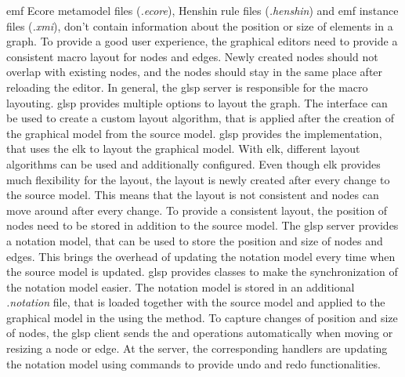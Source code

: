   \ac{emf} Ecore metamodel files (\textit{.ecore}), Henshin rule files (\textit{.henshin}) and \ac{emf} instance files (\textit{.xmi}), don't contain information about the position or size of elements in a graph. \cite{emf,henshin-repo} To provide a good user experience, the graphical editors need to provide a consistent macro layout for nodes and edges. Newly created nodes should not overlap with existing nodes, and the nodes should stay in the same place after reloading the editor. In general, the \ac{glsp} server is responsible for the macro layouting. \cite{glsp-doc} \ac{glsp} provides multiple options to layout the graph. The interface  can be used to create a custom layout algorithm, that is applied after the creation of the graphical model from the source model. \ac{glsp} provides the  implementation, that uses the \ac{elk} to layout the graphical model. \cite{elk-engine} With \ac{elk}, different layout algorithms can be used and additionally configured. Even though \ac{elk} provides much flexibility for the layout, the layout is newly created after every change to the source model. This means that the layout is not consistent and nodes can move around after every change. To provide a consistent layout, the position of nodes need to be stored in addition to the source model. The \ac{glsp} server provides a notation model, that can be used to store the position and size of nodes and edges. \cite{glsp-repo} This brings the overhead of updating the notation model every time when the source model is updated. \ac{glsp} provides classes to make the synchronization of the notation model easier. The notation model is stored in an additional \textit{.notation} file, that is loaded together with the source model and applied to the graphical model in the  using the  method. To capture changes of position and size of nodes, the \ac{glsp} client sends the  and  operations automatically when moving or resizing a node or edge. At the server, the corresponding handlers are updating the notation model using commands to provide undo and redo functionalities.

